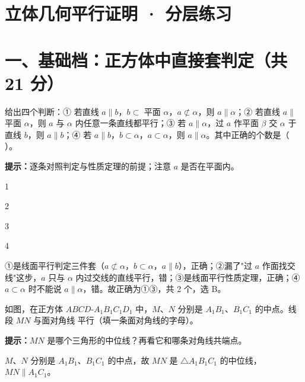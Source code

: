 \documentclass{exam-zh}
\begin{document}
\section*{立体几何平行证明 · 分层练习}

\section*{一、基础档：正方体中直接套判定（共 21 分）}


\begin{question}[points=5]
  给出四个判断：① 若直线 $a\parallel b$，$b\subset$ 平面 $\alpha$，$a\not\subset\alpha$，则 $a\parallel\alpha$；② 若直线 $a\parallel$ 平面 $\alpha$，则 $a$ 与 $\alpha$ 内任意一条直线都平行；③ 若 $a\parallel\alpha$，过 $a$ 作平面 $\beta$ 交 $\alpha$ 于直线 $b$，则 $a\parallel b$；④ 若 $a\parallel b$，$b\subset\alpha$，$a\subset\alpha$，则 $a\parallel\alpha$。其中正确的个数是（    ）。
  \begin{hintbox}
\textbf{提示：}逐条对照判定与性质定理的前提；注意 $a$ 是否在平面内。\end{hintbox}

  \begin{choices}
    \item 1
    \item 2
    \item 3
    \item 4
  \end{choices}
  \paren[B]
  \begin{solutionblock}
    ①是线面平行判定三件套（$a\not\subset\alpha$，$b\subset\alpha$，$a\parallel b$），正确；②漏了"过 $a$ 作面找交线"这步，$a$ 只与 $\alpha$ 内过交线的直线平行，错；③是线面平行性质定理，正确；④$a\subset\alpha$ 时不能说 $a\parallel\alpha$，错。故正确为①③，共 2 个，选 B。
  \end{solutionblock}
\end{question}



\begin{question}[points=6]
  如图，在正方体 $ABCD$-$A_{1}B_{1}C_{1}D_{1}$ 中，$M$、$N$ 分别是 $A_{1}B_{1}$、$B_{1}C_{1}$ 的中点。线段 $MN$ 与面对角线 \underline{\hspace{3em}} 平行（填一条面对角线的字母）。
  \begin{hintbox}
\textbf{提示：}$MN$ 是哪个三角形的中位线？再看它和哪条对角线共端点。\end{hintbox}

  \paren[$A_{1}C_{1}$]
  \begin{solutionblock}
    $M$、$N$ 分别是 $A_{1}B_{1}$、$B_{1}C_{1}$ 的中点，故 $MN$ 是 $\triangle A_{1}B_{1}C_{1}$ 的中位线，$MN\parallel A_{1}C_{1}$。
  \end{solutionblock}
\end{question}
\end{document}
